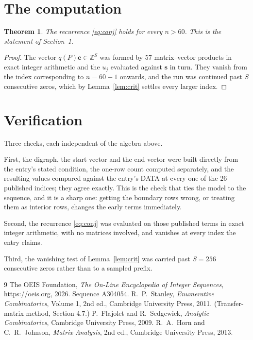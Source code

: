 \documentclass[11pt,a4paper]{article}
\theoremstyle{plain}
\newtheorem{theorem}{Theorem}
\theoremstyle{definition}
\begin{document}
\section{The computation}

\begin{theorem}
The recurrence \eqref{eq:conj} holds for every $n>60$. This is the statement of
Section~1.
\end{theorem}

\begin{proof}
The vector $q(P)\mathbf{e}\in\mathbb{Z}^{S}$ was formed by $57$ matrix--vector
products in exact integer arithmetic and the $u_j$ evaluated against $\mathbf{s}$ in turn.
They vanish from the index corresponding to $n=60+1$ onwards, and the run was continued
past $S$ consecutive zeros, which by Lemma~\ref{lem:crit} settles every larger index.
\end{proof}

\section{Verification}

Three checks, each independent of the algebra above.

First, the digraph, the start vector and the end vector were built directly from the
entry's stated condition, the one-row count computed separately, and the resulting values
compared against the entry's DATA at every one of the $26$ published indices; they
agree exactly. This is the check that ties the model to the sequence, and it is a sharp one:
getting the boundary rows wrong, or treating them as interior rows, changes the early terms
immediately.

Second, the recurrence \eqref{eq:conj} was evaluated on those published terms in exact
integer arithmetic, with no matrices involved, and vanishes at every index the entry claims.

Third, the vanishing test of Lemma~\ref{lem:crit} was carried past $S=256$ consecutive
zeros rather than to a sampled prefix.

\begin{thebibliography}{9}
 The OEIS Foundation, \emph{The On-Line Encyclopedia of Integer
Sequences}, \url{https://oeis.org}, 2026. Sequence A304054.
 R.~P.~Stanley, \emph{Enumerative Combinatorics}, Volume 1, 2nd ed.,
Cambridge University Press, 2011. (Transfer-matrix method, Section 4.7.)
 P.~Flajolet and R.~Sedgewick, \emph{Analytic Combinatorics}, Cambridge
University Press, 2009.
 R.~A.~Horn and C.~R.~Johnson, \emph{Matrix Analysis}, 2nd ed., Cambridge
University Press, 2013.
\end{thebibliography}
\end{document}
